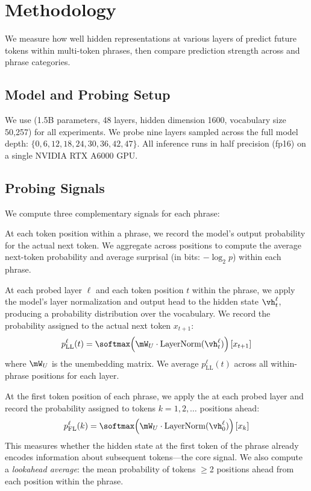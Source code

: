 \section{Methodology}
\label{sec:method}

We measure how well hidden representations at various layers of \gptxl predict future tokens within multi-token phrases, then compare prediction strength across \comp and \noncomp phrase categories.

\subsection{Model and Probing Setup}

We use \gptxl (1.5B parameters, 48 layers, hidden dimension 1600, vocabulary size 50,257) for all experiments.
We probe nine layers sampled across the full model depth: $\{0, 6, 12, 18, 24, 30, 36, 42, 47\}$.
All inference runs in half precision (fp16) on a single NVIDIA RTX A6000 GPU.

\subsection{Probing Signals}

We compute three complementary signals for each phrase:

At each token position within a phrase, we record the model's output probability for the actual next token.
We aggregate across positions to compute the average next-token probability and average surprisal (in bits: $-\log_2 p$) within each phrase.

At each probed layer $\ell$ and each token position $t$ within the phrase, we apply the model's layer normalization and output head to the hidden state $\vh_t^\ell$, producing a probability distribution over the vocabulary.
We record the probability assigned to the actual next token $x_{t+1}$:
\begin{equation}
    p_{\text{LL}}^\ell(t) = \softmax\!\left(\mW_U \cdot \text{LayerNorm}(\vh_t^\ell)\right)[x_{t+1}]
    \label{eq:logitlens}
\end{equation}
where $\mW_U$ is the unembedding matrix.
We average $p_{\text{LL}}^\ell(t)$ across all within-phrase positions for each layer.

At the first token position of each phrase, we apply the \logitlens at each probed layer and record the probability assigned to tokens $k = 1, 2, \ldots$ positions ahead:
\begin{equation}
    p_{\text{FL}}^\ell(k) = \softmax\!\left(\mW_U \cdot \text{LayerNorm}(\vh_0^\ell)\right)[x_k]
    \label{eq:futurelens}
\end{equation}
This measures whether the hidden state at the first token of the phrase already encodes information about subsequent tokens---the core \futurelens signal.
We also compute a \emph{lookahead average}: the mean probability of tokens $\geq$2 positions ahead from each position within the phrase.


